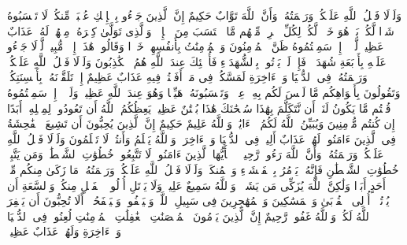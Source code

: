 \startbuffer[\q:24:10]
وَلَوۡلَا فَضۡلُ ٱللَّهِ عَلَیۡكُمۡ وَرَحۡمَتُهُۥ وَأَنَّ ٱللَّهَ تَوَّابٌ حَكِیمٌ%
\stopbuffer%
\startbuffer[\q:24:11]
إِنَّ ٱلَّذِینَ جَاۤءُو بِٱلۡإِفۡكِ عُصۡبَةࣱ مِّنكُمۡۚ لَا تَحۡسَبُوهُ شَرࣰّا لَّكُمۖ بَلۡ هُوَ خَیۡرࣱ لَّكُمۡۚ لِكُلِّ ٱمۡرِئࣲ مِّنۡهُم مَّا ٱكۡتَسَبَ مِنَ ٱلۡإِثۡمِۚ وَٱلَّذِی تَوَلَّىٰ كِبۡرَهُۥ مِنۡهُمۡ لَهُۥ عَذَابٌ عَظِیمࣱ%
\stopbuffer%
\startbuffer[\q:24:12]
لَّوۡلَاۤ إِذۡ سَمِعۡتُمُوهُ ظَنَّ ٱلۡمُؤۡمِنُونَ وَٱلۡمُؤۡمِنَٰتُ بِأَنفُسِهِمۡ خَیۡرࣰا وَقَالُوا۟ هَٰذَاۤ إِفۡكࣱ مُّبِینࣱ%
\stopbuffer%
\startbuffer[\q:24:13]
لَّوۡلَا جَاۤءُو عَلَیۡهِ بِأَرۡبَعَةِ شُهَدَاۤءَۚ فَإِذۡ لَمۡ یَأۡتُوا۟ بِٱلشُّهَدَاۤءِ فَأُو۟لَٰۤئِكَ عِندَ ٱللَّهِ هُمُ ٱلۡكَٰذِبُونَ%
\stopbuffer%
\startbuffer[\q:24:14]
وَلَوۡلَا فَضۡلُ ٱللَّهِ عَلَیۡكُمۡ وَرَحۡمَتُهُۥ فِی ٱلدُّنۡیَا وَٱلۡءَاخِرَةِ لَمَسَّكُمۡ فِی مَاۤ أَفَضۡتُمۡ فِیهِ عَذَابٌ عَظِیمٌ%
\stopbuffer%
\startbuffer[\q:24:15]
إِذۡ تَلَقَّوۡنَهُۥ بِأَلۡسِنَتِكُمۡ وَتَقُولُونَ بِأَفۡوَاهِكُم مَّا لَیۡسَ لَكُم بِهِۦ عِلۡمࣱ وَتَحۡسَبُونَهُۥ هَیِّنࣰا وَهُوَ عِندَ ٱللَّهِ عَظِیمࣱ%
\stopbuffer%
\startbuffer[\q:24:16]
وَلَوۡلَاۤ إِذۡ سَمِعۡتُمُوهُ قُلۡتُم مَّا یَكُونُ لَنَاۤ أَن نَّتَكَلَّمَ بِهَٰذَا سُبۡحَٰنَكَ هَٰذَا بُهۡتَٰنٌ عَظِیمࣱ%
\stopbuffer%
\startbuffer[\q:24:17]
یَعِظُكُمُ ٱللَّهُ أَن تَعُودُوا۟ لِمِثۡلِهِۦۤ أَبَدًا إِن كُنتُم مُّؤۡمِنِینَ%
\stopbuffer%
\startbuffer[\q:24:18]
وَیُبَیِّنُ ٱللَّهُ لَكُمُ ٱلۡءَایَٰتِۚ وَٱللَّهُ عَلِیمٌ حَكِیمٌ%
\stopbuffer%
\startbuffer[\q:24:19]
إِنَّ ٱلَّذِینَ یُحِبُّونَ أَن تَشِیعَ ٱلۡفَٰحِشَةُ فِی ٱلَّذِینَ ءَامَنُوا۟ لَهُمۡ عَذَابٌ أَلِیمࣱ فِی ٱلدُّنۡیَا وَٱلۡءَاخِرَةِۚ وَٱللَّهُ یَعۡلَمُ وَأَنتُمۡ لَا تَعۡلَمُونَ%
\stopbuffer%
\startbuffer[\q:24:20]
وَلَوۡلَا فَضۡلُ ٱللَّهِ عَلَیۡكُمۡ وَرَحۡمَتُهُۥ وَأَنَّ ٱللَّهَ رَءُوفࣱ رَّحِیمࣱ%
\stopbuffer%
\startbuffer[\q:24:21]
۞ یَٰۤأَیُّهَا ٱلَّذِینَ ءَامَنُوا۟ لَا تَتَّبِعُوا۟ خُطُوَٰتِ ٱلشَّیۡطَٰنِۚ وَمَن یَتَّبِعۡ خُطُوَٰتِ ٱلشَّیۡطَٰنِ فَإِنَّهُۥ یَأۡمُرُ بِٱلۡفَحۡشَاۤءِ وَٱلۡمُنكَرِۚ وَلَوۡلَا فَضۡلُ ٱللَّهِ عَلَیۡكُمۡ وَرَحۡمَتُهُۥ مَا زَكَىٰ مِنكُم مِّنۡ أَحَدٍ أَبَدࣰا وَلَٰكِنَّ ٱللَّهَ یُزَكِّی مَن یَشَاۤءُۗ وَٱللَّهُ سَمِیعٌ عَلِیمࣱ%
\stopbuffer%
\startbuffer[\q:24:22]
وَلَا یَأۡتَلِ أُو۟لُوا۟ ٱلۡفَضۡلِ مِنكُمۡ وَٱلسَّعَةِ أَن یُؤۡتُوۤا۟ أُو۟لِی ٱلۡقُرۡبَىٰ وَٱلۡمَسَٰكِینَ وَٱلۡمُهَٰجِرِینَ فِی سَبِیلِ ٱللَّهِۖ وَلۡیَعۡفُوا۟ وَلۡیَصۡفَحُوۤا۟ۗ أَلَا تُحِبُّونَ أَن یَغۡفِرَ ٱللَّهُ لَكُمۡۚ وَٱللَّهُ غَفُورࣱ رَّحِیمٌ%
\stopbuffer%
\startbuffer[\q:24:23]
إِنَّ ٱلَّذِینَ یَرۡمُونَ ٱلۡمُحۡصَنَٰتِ ٱلۡغَٰفِلَٰتِ ٱلۡمُؤۡمِنَٰتِ لُعِنُوا۟ فِی ٱلدُّنۡیَا وَٱلۡءَاخِرَةِ وَلَهُمۡ عَذَابٌ عَظِیمࣱ%
\stopbuffer%
